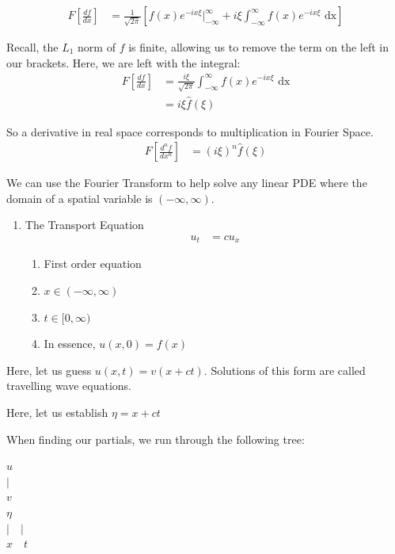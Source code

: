 \documentclass{article}
\begin{document}
\begin{align}
  F\left[\frac{df}{dx}\right] & = \frac{1}{\sqrt{2 \pi}}
  \left[
  f(x) e^{-i x \xi}\Big|^\infty_{-\infty} + i \xi \int^\infty_{-\infty} f(x) e^{- i x \xi} \text{ dx}
  \right]
\end{align}

Recall, the $L_1$ norm of $f$ is finite, allowing us to remove the term on the left in our brackets. Here, we are left with the integral:
%
\begin{align}
  F\left[\frac{df}{dx}\right] & = \frac{i \xi}{\sqrt{2 \pi}} \int^\infty_{-\infty} f(x) e^{-i x \xi} \text{ dx}\\
  & = i \xi \hat f(\xi)
\end{align}

So a derivative in real space corresponds to multiplication in Fourier Space.
%
\begin{align}
  F\left[ \frac{d^nf}{dx^n} \right] & = (i \xi)^n \hat f(\xi)
\end{align}

We can use the Fourier Transform to help solve any linear PDE where the domain of a spatial variable is $(-\infty, \infty)$.
\bigbreak
{}
\begin{enumerate}
  \item The Transport Equation
  \begin{align}
    u_t & = cu_x
  \end{align}
  \begin{enumerate}
    \item First order equation
    \item $x \in (-\infty, \infty)$
    \item $t \in [0, \infty)$
    \item In essence, $u(x, 0) = f(x)$
  \end{enumerate}
\end{enumerate}
  \bigbreak

  Here, let us guess $u(x, t) = v(x + ct)$. Solutions of this form are called travelling wave equations.

  Here, let us establish $\eta = x + ct$

  When finding our partials, we run through the following tree:

  \begin{center}
    $u$\\
    $|$\\
    $v$\\
    $\eta$\\
    $| \quad |$\\
    $x \quad t$
  \end{center}
\end{document}
